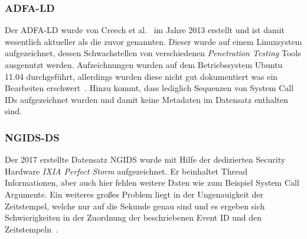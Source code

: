             \subsubsection{ADFA-LD}
                Der \ac{ADFA-LD} wurde von Creech et al.~\cite{UNMcritic} im Jahre 2013 erstellt und ist damit wesentlich aktueller als die zuvor genannten.
                Dieser wurde auf einem Linuxsystem aufgezeichnet, dessen Schwachstellen von verschiedenen \textit{Penetration Testing} Tools ausgenutzt werden.
                Aufzeichnungen wurden auf dem Betriebssystem Ubuntu 11.04 durchgeführt, allerdings wurden diese nicht gut dokumentiert was ein Bearbeiten erschwert~\cite{ADFA-LDcritic}.
                Hinzu kommt, dass lediglich Sequenzen von System Call IDs aufgezeichnet wurden und damit keine Metadaten im Datensatz enthalten sind.
            \subsubsection{NGIDS-DS}
                Der 2017 erstellte Datensatz NGIDS \cite{NGIDS} wurde mit Hilfe der dedizierten Security Hardware \textit{IXIA Perfect Storm} aufgezeichnet.
                Er beinhaltet Thread Informationen, aber auch hier fehlen weitere Daten wie zum Beispiel System Call Argumente.
                Ein weiteres großes Problem liegt in der Ungenauigkeit der Zeitstempel, welche nur auf die Sekunde genau sind und es ergeben sich Schwierigkeiten in der Zuordnung der beschriebenen Event ID und den Zeitstempeln~\cite{LIDDS}.
